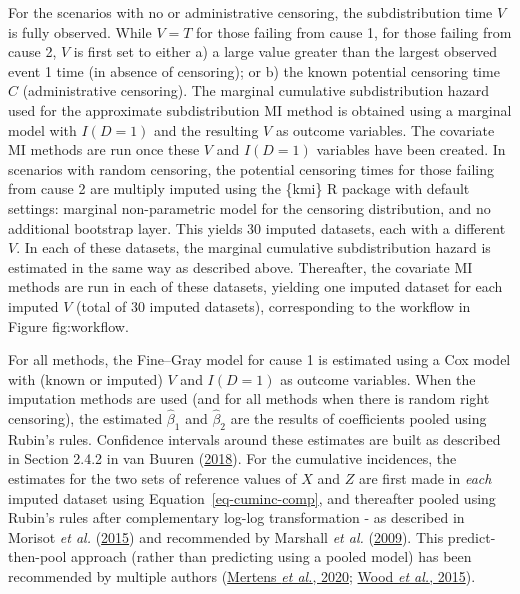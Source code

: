 \documentclass[
  letterpaper,
  DIV=11,
  numbers=noendperiod]{scrreprt}
\begin{document}
For the scenarios with no or administrative censoring, the
subdistribution time \(V\) is fully observed. While \(V = T\) for those
failing from cause 1, for those failing from cause 2, \(V\) is first set
to either a) a large value greater than the largest observed event 1
time (in absence of censoring); or b) the known potential censoring time
\(C\) (administrative censoring). The marginal cumulative
subdistribution hazard used for the approximate subdistribution MI
method is obtained using a marginal model with \(I(D=1)\) and the
resulting \(V\) as outcome variables. The covariate MI methods are run
once these \(V\) and \(I(D=1)\) variables have been created. In
scenarios with random censoring, the potential censoring times for those
failing from cause 2 are multiply imputed using the \{kmi\} R package
with default settings: marginal non-parametric model for the censoring
distribution, and no additional bootstrap layer. This yields 30 imputed
datasets, each with a different \(V\). In each of these datasets, the
marginal cumulative subdistribution hazard is estimated in the same way
as described above. Thereafter, the covariate MI methods are run in each
of these datasets, yielding one imputed dataset for each imputed \(V\)
(total of 30 imputed datasets), corresponding to the workflow in Figure
fig:workflow.

For all methods, the Fine--Gray model for cause 1 is estimated using a
Cox model with (known or imputed) \(V\) and \(I(D = 1)\) as outcome
variables. When the imputation methods are used (and for all methods
when there is random right censoring), the estimated \(\hat{\beta}_{1}\)
and \(\hat{\beta}_{2}\) are the results of coefficients pooled using
Rubin's rules. Confidence intervals around these estimates are built as
described in Section 2.4.2 in van Buuren
(\protect\hyperlink{ref-buurenFlexibleImputationMissing2018}{2018}). For
the cumulative incidences, the estimates for the two sets of reference
values of \(X\) and \(Z\) are first made in \emph{each} imputed dataset
using Equation~\ref{eq-cuminc-comp}, and thereafter pooled using Rubin's
rules after complementary log-log transformation - as described in
Morisot \emph{et al.}
(\protect\hyperlink{ref-morisotProstateCancerNet2015}{2015}) and
recommended by Marshall \emph{et al.}
(\protect\hyperlink{ref-marshallCombiningEstimatesInterest2009}{2009}).
This predict-then-pool approach (rather than predicting using a pooled
model) has been recommended by multiple authors
(\protect\hyperlink{ref-mertensConstructionAssessmentPrediction2020}{Mertens
\emph{et al.}, 2020};
\protect\hyperlink{ref-woodEstimationUsePredictions2015}{Wood \emph{et
al.}, 2015}).
\end{document}
